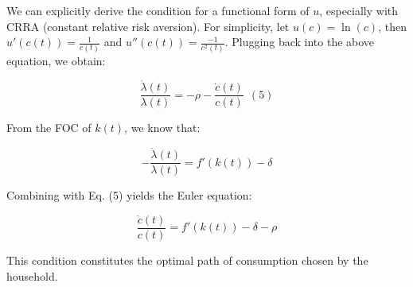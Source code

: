 \documentclass[11pt,a4paper]{book}
\theoremstyle{definition}\newtheorem{definition}{Definition}
\theoremstyle{definition}\newtheorem{fact}{Fact}
\theoremstyle{definition}\newtheorem{remark}{Remark}
\theoremstyle{definition}\newtheorem{ex}{Ex.}
\theoremstyle{definition}\newtheorem{project}{Project}
\theoremstyle{definition}\newtheorem{problem}{Problem}
\theoremstyle{definition}\newtheorem{example}{Example}
\numberwithin{theorem}{section}
\numberwithin{corollary}{chapter}
\numberwithin{assumption}{chapter}
\numberwithin{definition}{chapter}
\numberwithin{prop}{chapter}
\numberwithin{notation}{chapter}
\numberwithin{problem}{chapter}
\numberwithin{example}{chapter}
\numberwithin{fact}{chapter}
\numberwithin{ex}{chapter}
\begin{document}
We can explicitly derive the condition for a functional form of $u$, especially with CRRA (constant relative risk aversion). For simplicity, let $u(c) = \ln(c)$, then $u'(c(t)) = \frac{1}{c(t)}$ and $u''(c(t)) = \frac{-1}{c^2(t)}$. Plugging back into the above equation, we obtain:

$$
    \frac{\dot{\lambda}(t)}{\lambda(t)} = -\rho - \frac{\dot{c}(t)}{c(t)} \ \ (5)
$$

From the FOC of $k(t)$, we know that:

$$
    - \frac{\dot{\lambda}(t)}{\lambda(t)} = f'(k(t)) - \delta
$$

Combining with Eq. (5) yields the Euler equation:

$$
\frac{\dot{c}(t)}{c(t)} = f'(k(t)) - \delta -\rho
$$

This condition constitutes the optimal path of consumption chosen by the household.
\end{document}
